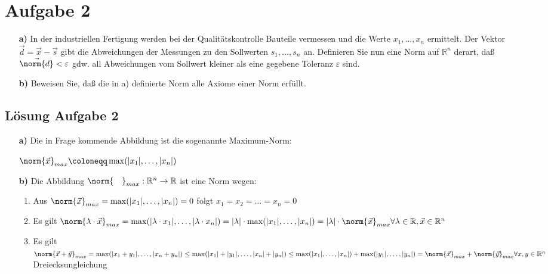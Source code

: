 \documentclass[ngerman, a4paper]{scrartcl}
\begin{document}
	\section*{Aufgabe 2}
	\begin{samepage}
	\begin{itemize}
		\item[\textbf{a)}]In der industriellen Fertigung werden bei der Qualitätskontrolle Bauteile vermessen und die Werte $ x_1, \ldots, x_n $ ermittelt. Der Vektor $\vec{d} = \vec{x} - \vec{s}$ gibt die Abweichungen der Messungen zu den Sollwerten $s_1, \ldots, s_n$ an. Definieren Sie nun eine Norm auf $\mathbb{R}^n$ derart, daß $\vec{\norm{d}} < \varepsilon$ gdw. all Abweichungen vom Sollwert kleiner als eine gegebene Toleranz $\varepsilon$ sind.
		\item[\textbf{b)}] Beweisen Sie, daß die in a) definierte Norm alle Axiome einer Norm erfüllt.
	\end{itemize}	
	\end{samepage}
	
	\subsection*{Lösung Aufgabe 2}
	
	\begin{itemize}
		\item[\textbf{a)}] Die in Frage kommende Abbildung ist die sogenannte Maximum-Norm:
		
		$\norm{\vec{x}}_{max} \coloneqq \max(|x_1|, \dots, |x_n|)$
		\item[\textbf{b)}] Die Abbildung $\norm{\quad}_{max}: \mathbb{R}^n \rightarrow \mathbb{R}$ ist eine Norm wegen:
		\begin{enumerate}
			\item Aus $\norm{\vec{x}}_{max} = \max(|x_1|, \dots, |x_n|) = 0$ folgt $x_1 = x_2 = \ldots = x_n = 0$
			\item Es gilt $\norm{\lambda \cdot \vec{x}}_{max} = \max(|\lambda \cdot x_1|, \dots, |\lambda \cdot x_n|) = |\lambda| \cdot \max(|x_1|, \dots, |x_n|) = |\lambda| \cdot \norm{\vec{x}}_{max} \forall \lambda \in \mathbb{R}, \vec{x} \in \mathbb{R}^n$ 
			\item Es gilt $\norm{\vec{x} + \vec{y}}_{max} = \max(|x_1 + y_1|, \ldots, |x_n + y_n|) \le \max(|x_1| + |y_1|, \ldots, |x_n| + |y_n|) \le \max(|x_1|, \ldots, |x_n|) + \max(|y_1|, \ldots, |y_n|) = \norm{\vec{x}}_{max} + \norm{\vec{y}}_{max} \forall x, y \in \mathbb{R}^n$ Dreiecksungleichung
		\end{enumerate}
	\end{itemize}
	
\end{document}
